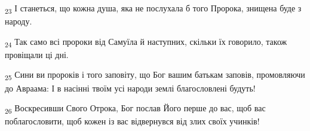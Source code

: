 \begin{tcolorbox}
\textsubscript{23} І станеться, що кожна душа, яка не послухала б того Пророка, знищена буде з народу.
\end{tcolorbox}
\begin{tcolorbox}
\textsubscript{24} Так само всі пророки від Самуїла й наступних, скільки їх говорило, також провіщали ці дні.
\end{tcolorbox}
\begin{tcolorbox}
\textsubscript{25} Сини ви пророків і того заповіту, що Бог вашим батькам заповів, промовляючи до Авраама: І в насінні твоїм усі народи землі благословлені будуть!
\end{tcolorbox}
\begin{tcolorbox}
\textsubscript{26} Воскресивши Свого Отрока, Бог послав Його перше до вас, щоб вас поблагословити, щоб кожен із вас відвернувся від злих своїх учинків!
\end{tcolorbox}
